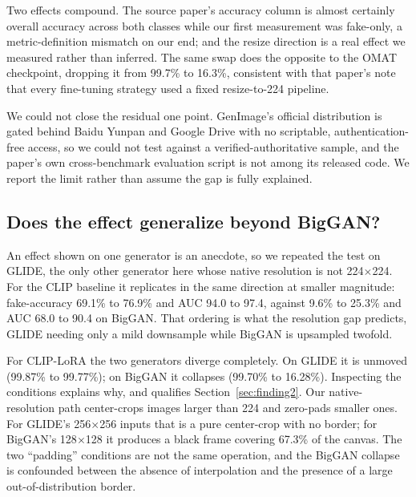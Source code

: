 \documentclass[3p,times,procedia]{elsarticle}
\begin{document}
Two effects compound. The source paper's accuracy column is almost
certainly overall accuracy across both classes while our first measurement
was fake-only, a metric-definition mismatch on our end; and the resize
direction is a real effect we measured rather than inferred. The same swap
does the opposite to the OMAT checkpoint, dropping it from 99.7\% to
16.3\%, consistent with that paper's note that every fine-tuning strategy
used a fixed resize-to-224 pipeline.

We could not close the residual one point. GenImage's official
distribution is gated behind Baidu Yunpan and Google Drive with no
scriptable, authentication-free access, so we could not test against a
verified-authoritative sample, and the paper's own cross-benchmark
evaluation script is not among its released code. We report the limit
rather than assume the gap is fully explained.

\subsection{Does the effect generalize beyond BigGAN?}
\label{sec:glide-preproc}

An effect shown on one generator is an anecdote, so we repeated the test on
GLIDE, the only other generator here whose native resolution is not
224$\times$224. For the CLIP baseline it replicates in the same direction
at smaller magnitude: fake-accuracy 69.1\% to 76.9\% and AUC 94.0 to 97.4,
against 9.6\% to 25.3\% and AUC 68.0 to 90.4 on BigGAN. That ordering is
what the resolution gap predicts, GLIDE needing only a mild downsample
while BigGAN is upsampled twofold.

For CLIP-LoRA the two generators diverge completely. On GLIDE it is
unmoved (99.87\% to 99.77\%); on BigGAN it collapses (99.70\% to 16.28\%).
Inspecting the conditions explains why, and qualifies
Section~\ref{sec:finding2}. Our native-resolution path center-crops images
larger than 224 and zero-pads smaller ones. For GLIDE's 256$\times$256
inputs that is a pure center-crop with no border; for BigGAN's
128$\times$128 it produces a black frame covering 67.3\% of the canvas. The
two ``padding'' conditions are not the same operation, and the BigGAN
collapse is confounded between the absence of interpolation and the
presence of a large out-of-distribution border.
\end{document}
